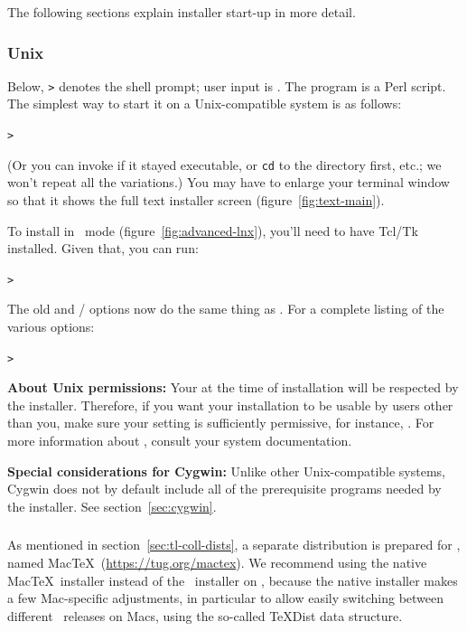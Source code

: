 \documentclass{article}
\begin{document}
The following sections explain installer start-up in more detail.

\subsubsection{Unix}

Below, \texttt{>} denotes the shell prompt; user input is
.
The  program is a Perl script.  The simplest way
to start it on a Unix-compatible system is as follows:
\begin{alltt}
> 
\end{alltt}
(Or you can invoke  if it stayed
executable, or \texttt{cd} to the directory first, etc.; we won't repeat
all the variations.)  You may have to enlarge your terminal window so
that it shows the full text installer screen
(figure~\ref{fig:text-main}).

To install in \GUI\ mode (figure~\ref{fig:advanced-lnx}), you'll need to
have Tcl/Tk installed.  Given that, you can run:
\begin{alltt}
> 
\end{alltt}

The old  and / options
now do the same thing as . For
a complete listing of the various options:
\begin{alltt}
> 
\end{alltt}

\textbf{About Unix permissions:} Your  at the time
of installation will be respected by the \TL{} installer.  Therefore, if
you want your installation to be usable by users other than you, make
sure your setting is sufficiently permissive, for instance, .  For more information about , consult your system
documentation.

\textbf{Special considerations for Cygwin:} Unlike other
Unix-compatible systems, Cygwin does not by default include all of the
prerequisite programs needed by the \TL{} installer.  See
section~\ref{sec:cygwin}.


\subsubsection{\MacOSX}
\label{sec:macosx}

As mentioned in section~\ref{sec:tl-coll-dists}, a separate distribution
is prepared for \MacOSX, named Mac\TeX\ (\url{https://tug.org/mactex}).
We recommend using the native Mac\TeX\ installer instead of the \TL\
installer on \MacOSX, because the native installer makes a few
Mac-specific adjustments, in particular to allow easily switching
between different \TL\ releases on Macs, using the so-called \TeX{}Dist
data structure.
\end{document}
